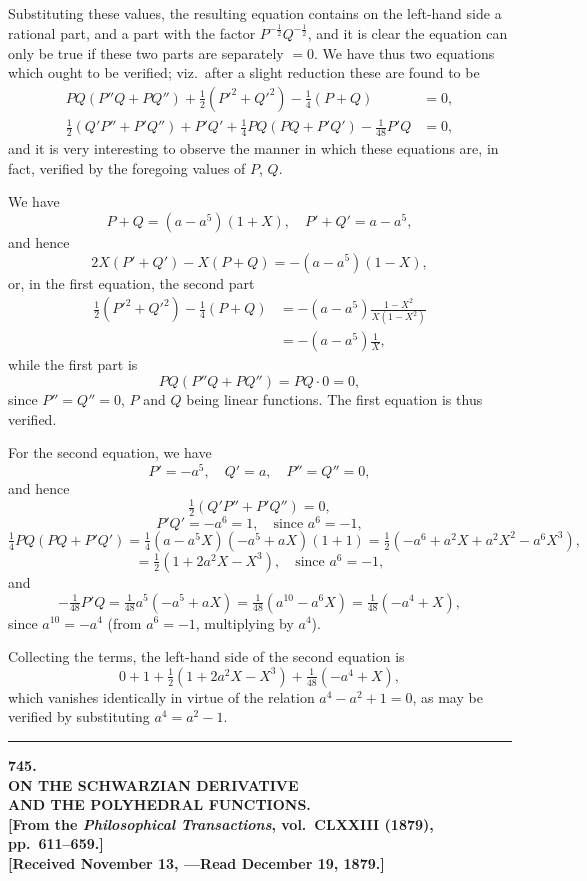 \documentclass[11pt,a4paper]{book}
\begin{document}
Substituting these values, the resulting equation contains on the left-hand
side a rational part, and a part with the factor $P^{-\frac{1}{2}}Q^{-\frac{1}{2}}$,
and it is clear the equation can only be true if these two parts are separately
$=0$. We have thus two equations which ought to be verified; viz.~after
a slight reduction these are found to be
\begin{align*}
PQ(P''Q+PQ'') + \tfrac{1}{2}(P'^2+Q'^2) - \tfrac{1}{4}(P+Q) &= 0,\\
\tfrac{1}{2}(Q'P''+P'Q'') + P'Q' + \tfrac{1}{4}PQ(PQ+P'Q') - \tfrac{1}{48}P'Q &= 0,
\end{align*}
and it is very interesting to observe the manner in which these equations
are, in fact, verified by the foregoing values of $P$, $Q$.

We have
\[
P+Q = (a-a^5)(1+X),\quad P'+Q' = a-a^5,
\]
and hence
\[
2X(P'+Q')-X(P+Q) = -(a-a^5)(1-X),
\]
or, in the first equation, the second part
\begin{align*}
\tfrac{1}{2}(P'^2+Q'^2)-\tfrac{1}{4}(P+Q)
&= -(a-a^5)\frac{1-X^2}{X(1-X^2)}\\
&= -(a-a^5)\frac{1}{X},
\end{align*}
while the first part is
\[
PQ(P''Q+PQ'') = PQ\cdot 0 = 0,
\]
since $P''=Q''=0$, $P$ and $Q$ being linear functions. The first equation
is thus verified.

For the second equation, we have
\[
P' = -a^5,\quad Q' = a,\quad P'' = Q'' = 0,
\]
and hence
\[
\tfrac{1}{2}(Q'P''+P'Q'') = 0,
\]
\[
P'Q' = -a^6 = 1,\quad\text{since $a^6=-1$},
\]
\[
\tfrac{1}{4}PQ(PQ+P'Q') = \tfrac{1}{4}(a-a^5X)(-a^5+aX)(1+1)
= \tfrac{1}{2}(-a^6+a^2X+a^2X^2-a^6X^3),
\]
\[
= \tfrac{1}{2}(1+2a^2X-X^3),\quad\text{since $a^6=-1$},
\]
and
\[
-\tfrac{1}{48}P'Q = \tfrac{1}{48}a^5(-a^5+aX) = \tfrac{1}{48}(a^{10}-a^6X)
= \tfrac{1}{48}(-a^4+X),
\]
since $a^{10}=-a^4$ (from $a^6=-1$, multiplying by $a^4$).

Collecting the terms, the left-hand side of the second equation is
\[
0 + 1 + \tfrac{1}{2}(1+2a^2X-X^3) + \tfrac{1}{48}(-a^4+X),
\]
which vanishes identically in virtue of the relation $a^4-a^2+1=0$,
as may be verified by substituting $a^4=a^2-1$.

\vspace{2em}
\begin{center}
\rule{0.5\textwidth}{0.4pt}
\end{center}
\clearpage


\begin{center}
\Large\bfseries 745.\\[6pt]
\Large\bfseries ON THE SCHWARZIAN DERIVATIVE\\
\Large\bfseries AND THE POLYHEDRAL FUNCTIONS.\\[12pt]
\normalsize
[From the \textit{Philosophical Transactions}, vol.~CLXXIII (1879),\\
pp.~611--659.]\\[12pt]
\small
[Received November 13, ---Read December 19, 1879.]
\end{center}
\end{document}
